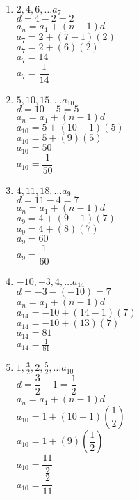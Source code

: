 \begin{enumerate}[label = \Alph*. ]
\begin{multicols}{2}
\begin{enumerate}[label = \arabic*. ]
\item %
$2, 4, 6,\ldots  a_7$ \\
$d=4-2=2$\\
$a_{n}=a_1+(n-1)d$\\
$a_{7}=2+(7-1)(2) $\\
$a_{7}=2+(6)(2) $\\
$a_{7}=14 $\\
$a_{7}=\dfrac{1}{14} $

\item %
$5, 10, 15, \ldots a_{10}$ \\
$d=10-5=5$\\
$a_{n}=a_1+(n-1)d$\\
$a_{10}=5+(10-1)(5) $\\
$a_{10}=5+(9)(5) $\\
$a_{10}=50 $\\
$a_{10}=\dfrac{1}{50}  $

\item %
$4, 11, 18,\ldots  a_9$\\
$d=11-4=7$\\
$a_{n}=a_1+(n-1)d$\\
$a_{9}=4+(9-1)(7) $\\
$a_{9}=4+(8)(7) $\\
$a_{9}=60 $\\
$a_{9}=\dfrac{1}{60}  $

\item %
$-10, -3, 4,\ldots  a_{14}$\\
$d=-3-(-10)=7$\\
$a_{n}=a_1+(n-1)d$\\
$a_{14}=-10+(14-1)(7) $\\
$a_{14}=-10+(13)(7) $\\
$a_{14}=81 $\\
$a_{14}=\displaystyle \frac{1}{81}  $

\item %
$\displaystyle 1, \frac{3}{2}, 2, \frac{5}{2},\ldots  a_{10}$\\ 
$d=\dfrac{3}{2}-1=\dfrac{1}{2}$\\
$a_{n}=a_1+(n-1)d$\\
$a_{10}=1+(10-1)\left( \dfrac{1}{2}\right) $\\
$a_{10}=1+(9)\left( \dfrac{1}{2}\right)  $\\
$a_{10}=\dfrac{11}{2} $\\
$a_{10}=\dfrac{2}{11} $


\end{enumerate}
\end{multicols}
\end{enumerate}
